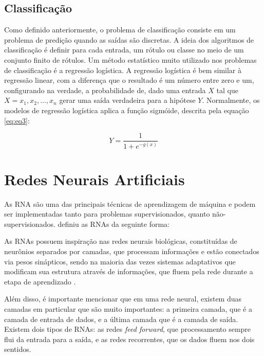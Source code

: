 \subsection{Classificação}
\label{subsecao:2:1:2}

Como definido anteriormente, o problema de classificação consiste em um problema de predição quando as saídas são discretas. A ideia dos algoritmos de classificação é definir para cada entrada, um rótulo ou classe no meio de um conjunto finito de rótulos. Um método estatístico muito utilizado nos problemas de classificação é a regressão logística. A regressão logística é bem similar à regressão linear, com a diferença que o resultado é um número entre zero e um, configurando na verdade, a probabilidade de, dado uma entrada $X$ tal que $X = {x_1, x_2, ..., x_n}$ gerar uma saída verdadeira para a hipótese $Y$. Normalmente, os modelos de regressão logística aplica a função sigmóide, descrita pela equação \ref{eq:eq3}:

\begin{equation}
\label{eq:eq3}
Y = \dfrac{1}{1 + e^{-g(x)}}
\end{equation}

\section{Redes Neurais Artificiais}
\label{secao:2:2}

As \ac{RNA} são uma das principais técnicas de aprendizagem de máquina e podem ser implementadas tanto para problemas supervisionados, quanto não-supervisionados.  definiu as \ac{RNA}s da seguinte forma:

\begin{citacao}
	As \ac{RNA}s possuem inspiração nas redes neurais biológicas, constituídas de neurônios separados por camadas, que processam informações e estão conectados via pesos sinápticos, sendo na maioria das vezes sistemas adaptativos que modificam sua estrutura através de informações, que fluem pela rede durante a etapa de aprendizado \cite{jost-2015}.
\end{citacao}

Além disso, é importante mencionar que em uma rede neural, existem duas camadas em particular que são muito importantes: a primeira camada, que é a camada de entrada de dados, e a última camada que é a camada de saída. Existem dois tipos de \ac{RNA}s: as redes \textit{feed forward}, que processamento sempre flui da entrada para a saída, e as redes recorrentes, que os dados fluem nos dois sentidos.

